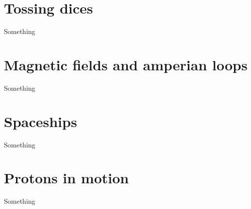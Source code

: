 \section{Tossing dices}
\label{sec:dices}
Something

\section{Magnetic fields and amperian loops}
\label{sec:magnamp}
Something

\section{Spaceships}
\label{sec:spaceship}
Something

\section{Protons in motion}
\label{sec:protons}
Something
